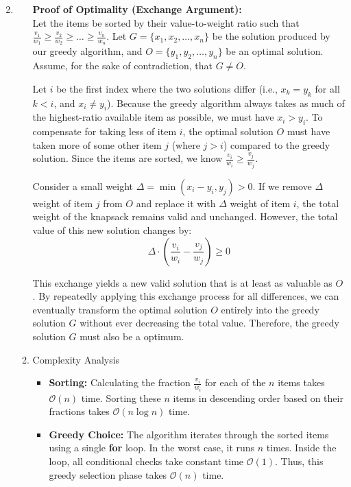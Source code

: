 \documentclass[12pt,a4paper]{article}
\makeatletter
\newtheorem*{solution}{Solution}
\theoremstyle{definition}
\renewenvironment{solution}[1][Solution]
{\par\pushQED{\qed}\normalfont\topsep6\p@\@plus6\p@\relax\trivlist
\item[\hskip\labelsep\bfseries#1\@addpunct{.}]\ignorespaces}{\popQED\endtrivlist\@endpefalse}
\makeatother
\begin{document}
\begin{enumerate}
\begin{solution}
\begin{enumerate}
\begin{minipage}{\linewidth}
        \end{minipage}
        
            \textbf{Proof of Optimality (Exchange Argument):} \\
            Let the items be sorted by their value-to-weight ratio such that $\frac{v_1}{w_1} \geq \frac{v_2}{w_2} \geq \ldots \geq \frac{v_n}{w_n}$. Let $G = \{x_1, x_2, \ldots, x_n\}$ be the solution produced by our greedy algorithm, and $O = \{y_1, y_2, \ldots, y_n\}$ be an optimal solution. Assume, for the sake of contradiction, that $G \neq O$. 
            
            Let $i$ be the first index where the two solutions differ (i.e., $x_k = y_k$ for all $k < i$, and $x_i \neq y_i$). Because the greedy algorithm always takes as much of the highest-ratio available item as possible, we must have $x_i > y_i$. To compensate for taking less of item $i$, the optimal solution $O$ must have taken more of some other item $j$ (where $j > i$) compared to the greedy solution. Since the items are sorted, we know $\frac{v_i}{w_i} \geq \frac{v_j}{w_j}$.
            
            Consider a small weight $\Delta = \min(x_i - y_i, y_j) > 0$. If we remove $\Delta$ weight of item $j$ from $O$ and replace it with $\Delta$ weight of item $i$, the total weight of the knapsack remains valid and unchanged. However, the total value of this new solution changes by:
            $$\Delta \cdot \left( \frac{v_i}{w_i} - \frac{v_j}{w_j} \right) \geq 0$$
            
            This exchange yields a new valid solution that is at least as valuable as $O$. By repeatedly applying this exchange process for all differences, we can eventually transform the optimal solution $O$ entirely into the greedy solution $G$ without ever decreasing the total value. Therefore, the greedy solution $G$ must also be a optimum.
        
            
           
            
           \item Complexity Analysis

            \begin{itemize}
               \item \textbf{Sorting:} Calculating the fraction $\frac{v_i}{w_i}$ for each of the $n$ items takes $\mathcal{O}(n)$ time. Sorting these $n$ items in descending order based on their fractions takes $\mathcal{O}(n \log n)$ time.
               \item \textbf{Greedy Choice:} The algorithm iterates through the sorted items using a single \textbf{for} loop. In the worst case, it runs $n$ times. Inside the loop, all conditional checks take constant time $\mathcal{O}(1)$. Thus, this greedy selection phase takes $\mathcal{O}(n)$ time.
            \end{itemize}


\end{enumerate}
\end{solution}
\end{enumerate}
\end{document}
